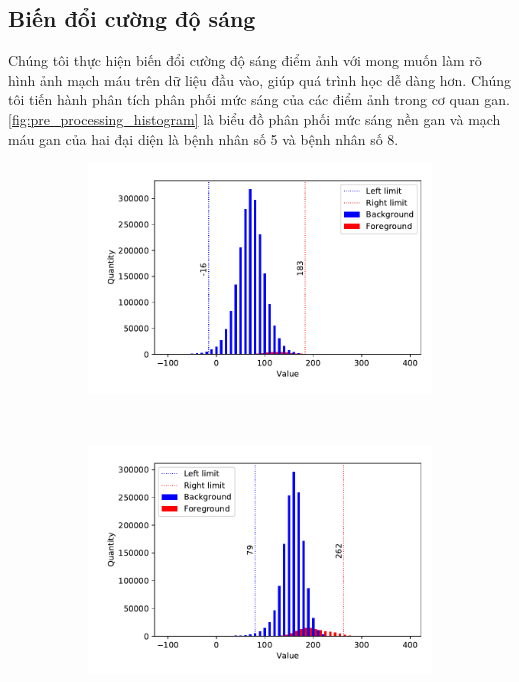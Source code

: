 \subsection{Biến đổi cường độ sáng} 
\label{subsec:bien_doi_cuong_do_sang}
	Chúng tôi thực hiện biến đổi cường độ sáng điểm ảnh với mong muốn làm rõ hình ảnh mạch máu trên dữ liệu đầu vào, giúp quá trình học dễ dàng hơn. Chúng tôi tiến hành phân tích phân phối mức sáng của các điểm ảnh trong cơ quan gan. \autoref{fig:pre_processing_histogram} là biểu đồ phân phối mức sáng nền gan và mạch máu gan của hai đại diện là bệnh nhân số 5 và bệnh nhân số 8.
	\begin{figure}[h!]
		\centering
		\begin{subfigure}[b]{.8\textwidth}
			\includegraphics[width=\textwidth]{figures/pre_processing_histogram_5}
			\caption{}
			\label{fig:pre_processing_histogram_5}
		\end{subfigure}\\[5mm]
		\begin{subfigure}[b]{.8\textwidth}
			\includegraphics[width=\textwidth]{figures/pre_processing_histogram_8}

\end{subfigure}
\end{figure}
